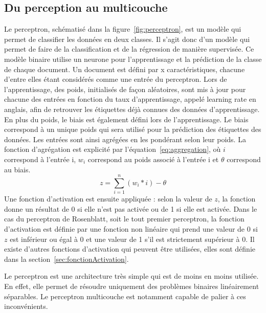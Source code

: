\subsection{Du perception au multicouche}

Le perceptron, schématisé dans la figure~\ref{fig:perceptron}, est un modèle qui permet de classifier les données en deux classes. Il s'agit donc d'un modèle qui permet de faire de la classification et de la régression de manière supervisée. Ce modèle binaire utilise un neurone pour l'apprentissage et la prédiction de la classe de chaque document. Un document est défini par x caractéristiques, chacune d'entre elles étant considérés comme une entrée du perceptron. Lors de l'apprentissage, des poids, initialisés de façon aléatoires, sont mis à jour pour chacune des entrées en fonction du taux d'apprentissage, appelé learning rate en anglais, afin de retrouver les étiquettes déjà connues des données d'apprentissage. En plus du poids, le biais est également défini lors de l'apprentissage. Le biais correspond à un unique poids qui sera utilisé pour la prédiction des étiquettes des données. Les entrées sont ainsi agrégées en les pondérant selon leur poids. La fonction d'agrégation est explicité par l'équation~\ref{eq:aggregation}, où $i$ correspond à l'entrée i, $w_i$ correspond au poids associé à l'entrée i et $\theta$ correspond au biais.
\begin{equation}
  z = \sum_{i=1}^{n}(w_i*i) - \theta
  \label{eq:aggregation}
\end{equation}
Une fonction d'activation est ensuite appliquée : selon la valeur de $z$, la fonction donne un résultat de 0 si elle n'est pas activée ou de 1 si elle est activée. Dans le cas du perceptron de Rosenblatt, soit le tout premier perceptron, la fonction d'activation est définie par une fonction non linéaire qui prend une valeur de 0 si $z$ est inférieur ou égal à 0 et une valeur de 1 s'il est strictement supérieur à 0.
Il existe d'autres fonctions d'activation qui peuvent être utilisées, elles sont définie dans la section~\ref{sec:fonctionActivation}.

Le perceptron est une architecture très simple qui est de moins en moins utilisée. En effet, elle permet de résoudre uniquement des problèmes binaires linéairement séparables. Le perceptron multicouche est notamment capable de palier à ces inconvénients.

